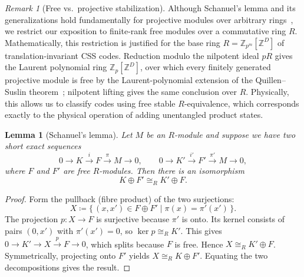 \documentclass[aps,prx,english,superscriptaddress,twocolumn,tightenlines,showpacs,longbibliography,floatfix,amsfonts]{revtex4-2}
\newtheorem{lemma}{Lemma}
\theoremstyle{remark}
\newtheorem{remark}{Remark}
\theoremstyle{definition}
\begin{document}
\begin{remark}[Free vs.\ projective stabilization]
	Although Schanuel's lemma and its generalizations hold fundamentally for
	projective modules over arbitrary rings~\cite[\S~5A]{Lam1999}, we restrict our
	exposition to finite‑rank free modules over a commutative ring $R$.
	Mathematically, this restriction is justified for the base ring
	$R=\mathbb Z_{p^m}[\mathbb Z^D]$ of translation‑invariant CSS codes.
	Reduction modulo the nilpotent ideal $pR$ gives the Laurent polynomial ring
	$\mathbb Z_p[\mathbb Z^D]$, over which every finitely generated projective
	module is free by the Laurent-polynomial extension of the Quillen--Suslin
	theorem~\cite{Swan1978}; nilpotent lifting gives the same conclusion over
	$R$. Physically, this
	allows us to classify codes using free stable \(R\)-equivalence, which
	corresponds exactly to the physical operation of adding unentangled product
	states. %
\end{remark}

\begin{lemma}[Schanuel's lemma]
	\label{lem:base-schanuel}
	Let $M$ be an $R$-module and suppose we have two short exact sequences
	\begin{equation}
		0 \to K \xrightarrow{i} F \xrightarrow{\pi} M \to 0,\qquad
		0 \to K' \xrightarrow{i'} F' \xrightarrow{\pi'} M \to 0,
	\end{equation}
	where $F$ and $F'$ are free $R$-modules. Then there is an isomorphism
	\begin{equation}
		K \oplus F' \cong_R K' \oplus F .
	\end{equation}
\end{lemma}

\begin{proof}
	Form the pullback (fibre product) of the two surjections:
	\begin{equation}
		X \coloneqq \{\, (x,x') \in F \oplus F' \mid \pi(x) = \pi'(x') \,\}.
	\end{equation}
	The projection $p:X\to F$ is surjective because $\pi'$ is onto. Its kernel
	consists of pairs $(0,x')$ with $\pi'(x')=0$, so $\ker p \cong_R K'$. This
	gives $0 \to K' \to X \xrightarrow{p} F \to 0$, which splits because $F$
	is free. Hence $X \cong_R K' \oplus F$. Symmetrically, projecting onto $F'$
	yields $X \cong_R K \oplus F'$. Equating the two decompositions gives the
	result.
\end{proof}
\end{document}
